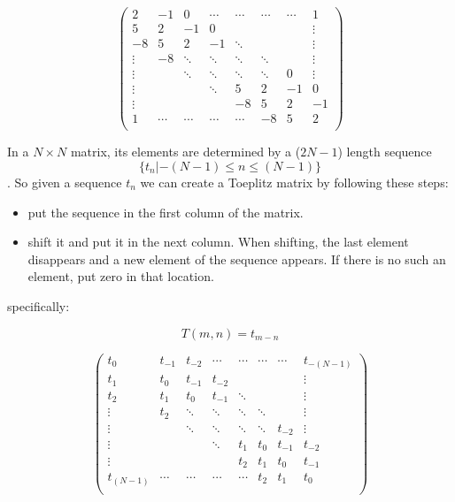 \documentclass[11pt]{article}
\begin{document}
	\begin{equation}
	\begin{pmatrix}
	2 & -1 & 0 & \cdots & \cdots & \cdots & \cdots & 1\\
	5 & 2 & -1 & 0 & & & & \vdots\\
	-8 & 5 & 2 & -1 & \ddots & & & \vdots\\
	\vdots & -8 & \ddots & \ddots & \ddots & \ddots & & \vdots\\
	\vdots & & \ddots & \ddots & \ddots & \ddots & 0 & \vdots\\
	\vdots & & & \ddots & 5 & 2 & -1 & 0\\
	\vdots & & & & -8 & 5 & 2 & -1\\
	1 & \cdots & \cdots  & \cdots & \cdots & -8 & 5 & 2\\
	\end{pmatrix}
	\end{equation}
	\vspace{10mm}
	
	In a $N \times N$ matrix, its elements are determined by a ($2N -1$) length sequence
	 $$\{t_n | -(N-1) \le n \le (N-1)\}$$.
	 So given a sequence $t_n$ we can create a Toeplitz matrix by following these steps:   
	
	\begin{itemize}
		\item  put the sequence in the first column of the matrix.
		\item  shift it and put it in the next column. When shifting, the last element disappears and a new element of the sequence appears. If there is no such an element, put zero in that location.
	\end{itemize} 
	
	
	specifically:
	
	\large $$ T(m,n)=t_{m-n} $$
	
	\begin{equation}
	\begin{pmatrix}
	t_0 & t_{-1} & t_{-2} & \cdots & \cdots & \cdots & \cdots & t_{-(N-1)}\\
	t_1 & t_0 & t_{-1} & t_{-2} & & & & \vdots\\
	t_2 & t_1 & t_0 & t_{-1} & \ddots & & & \vdots\\
	\vdots & t_2 & \ddots & \ddots & \ddots & \ddots & & \vdots\\
	\vdots & & \ddots & \ddots & \ddots & \ddots & t_{-2} & \vdots\\
	\vdots & & & \ddots & t_1 & t_0 & t_{-1} & t_{-2}\\
	\vdots & & & & t_2 & t_1 & t_0 & t_{-1}\\
	t_{(N-1)} & \cdots & \cdots  & \cdots & \cdots & t_2 & t_1 & t_0\\
	\end{pmatrix}
	\end{equation}
	\vspace{10mm}
	
\end{document}
